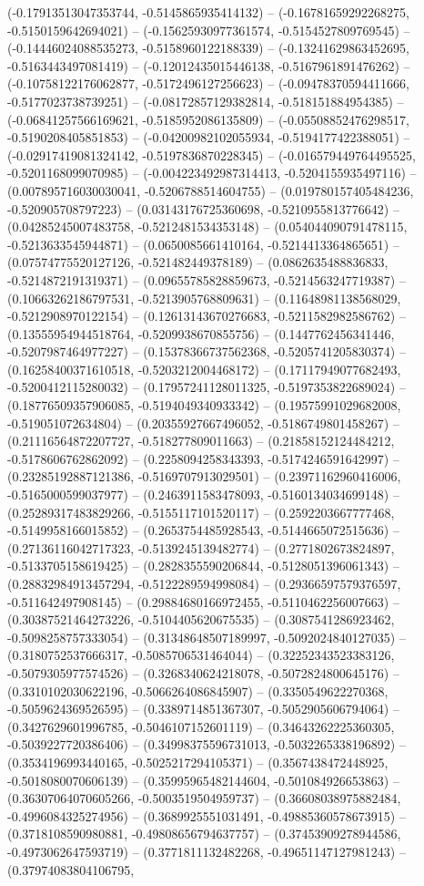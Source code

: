 (-0.17913513047353744, -0.5145865935414132) -- (-0.16781659292268275, -0.5150159642694021) -- (-0.15625930977361574, -0.5154527809769545) -- (-0.14446024088535273, -0.5158960122188339) -- (-0.13241629863452695, -0.5163443497081419) -- (-0.12012435015446138, -0.5167961891476262) -- (-0.10758122176062877, -0.5172496127256623) -- (-0.09478370594411666, -0.5177023738739251) -- (-0.08172857129382814, -0.518151884954385) -- (-0.06841257566169621, -0.5185952086135809) -- (-0.05508852476298517, -0.5190208405851853) -- (-0.04200982102055934, -0.5194177422388051) -- (-0.02917419081324142, -0.5197836870228345) -- (-0.016579449764495525, -0.5201168099070985) -- (-0.004223492987314413, -0.5204155935497116) -- (0.007895716030030041, -0.5206788514604755) -- (0.019780157405484236, -0.520905708797223) -- (0.03143176725360698, -0.5210955813776642) -- (0.04285245007483758, -0.5212481534353148) -- (0.054044090791478115, -0.5213633545944871) -- (0.0650085661410164, -0.5214413364865651) -- (0.07574775520127126, -0.521482449378189) -- (0.0862635488836833, -0.5214872191319371) -- (0.09655785828859673, -0.5214563247719387) -- (0.10663262186797531, -0.5213905768809631) -- (0.11648981138568029, -0.5212908970122154) -- (0.12613143670276683, -0.5211582982586762) -- (0.13555954944518764, -0.5209938670855756) -- (0.1447762456341446, -0.5207987464977227) -- (0.15378366737562368, -0.5205741205830374) -- (0.16258400371610518, -0.5203212004468172) -- (0.17117949077682493, -0.5200412115280032) -- (0.17957241128011325, -0.5197353822689024) -- (0.18776509357906085, -0.5194049340933342) -- (0.19575991029682008, -0.519051072634804) -- (0.20355927667496052, -0.5186749801458267) -- (0.21116564872207727, -0.518277809011663) -- (0.21858152124484212, -0.5178606762862092) -- (0.2258094258343393, -0.5174246591642997) -- (0.23285192887121386, -0.5169707913029501) -- (0.23971162960416006, -0.5165000599037977) -- (0.2463911583478093, -0.5160134034699148) -- (0.25289317483829266, -0.5155117101520117) -- (0.2592203667777468, -0.5149958166015852) -- (0.2653754485928543, -0.5144665072515636) -- (0.27136116042717323, -0.5139245139482774) -- (0.2771802673824897, -0.5133705158619425) -- (0.2828355590206844, -0.5128051396061343) -- (0.28832984913457294, -0.5122289594998084) -- (0.29366597579376597, -0.511642497908145) -- (0.29884680166972455, -0.5110462256007663) -- (0.30387521464273226, -0.5104405620675535) -- (0.3087541286923462, -0.5098258757333054) -- (0.31348648507189997, -0.5092024840127035) -- (0.3180752537666317, -0.5085706531464044) -- (0.32252343523383126, -0.5079305977574526) -- (0.3268340624218078, -0.5072824800645176) -- (0.3310102030622196, -0.5066264086845907) -- (0.3350549622270368, -0.5059624369526595) -- (0.3389714851367307, -0.5052905606794064) -- (0.3427629601996785, -0.5046107152601119) -- (0.34643262225360305, -0.5039227720386406) -- (0.34998375596731013, -0.5032265338196892) -- (0.3534196993440165, -0.5025217294105371) -- (0.3567438472448925, -0.5018080070606139) -- (0.35995965482144604, -0.501084926653863) -- (0.36307064070605266, -0.5003519504959737) -- (0.36608038975882484, -0.4996084325274956) -- (0.3689925551031491, -0.49885360578673915) -- (0.3718108590980881, -0.49808656794637757) -- (0.37453909278944586, -0.4973062647593719) -- (0.3771811132482268, -0.49651147127981243) -- (0.37974083804106795, 